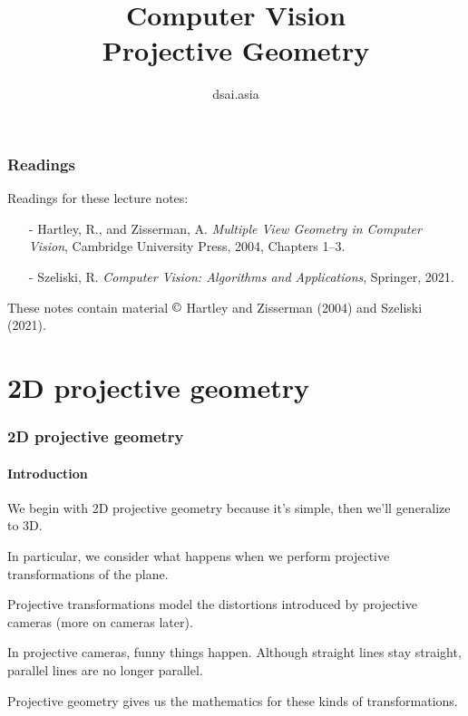\documentclass[aspectratio=169]{beamer}
\title[Computer Vision]{Computer Vision\\Projective Geometry}
\author{dsai.asia}
\institute[]{Asia Data Science and Artificial Intelligence Master's Program}
\date{}
\begin{document}


\frame{\titlepage}

%

\begin{frame}
\frametitle{Readings}

Readings for these lecture notes:
\begin{itemize}
\item[-] Hartley, R., and Zisserman, A. {\em Multiple View Geometry in
    Computer Vision}, Cambridge University Press, 2004, Chapters 1--3.
\item[-] Szeliski, R. \textit{Computer Vision: Algorithms and Applications},
    Springer, 2021.
\end{itemize}

\medskip

These notes contain material $\copyright$ Hartley and Zisserman
(2004) and Szeliski (2021).

\end{frame}

\section{2D projective geometry}


\begin{frame}
\frametitle{2D projective geometry}
\framesubtitle{Introduction}

We begin with 2D projective geometry because it's simple, then we'll
generalize to 3D.

\medskip

In particular, we consider \alert{what happens when we perform
projective transformations of the plane}.

\medskip

\alert{Projective transformations} model the distortions introduced by
\alert{projective cameras} (more on cameras later).

\medskip

In projective cameras, funny things happen.  Although straight lines
stay straight, parallel lines are no longer parallel.

\medskip

Projective geometry gives us the mathematics for these kinds of
transformations.

\end{frame}
\end{document}
